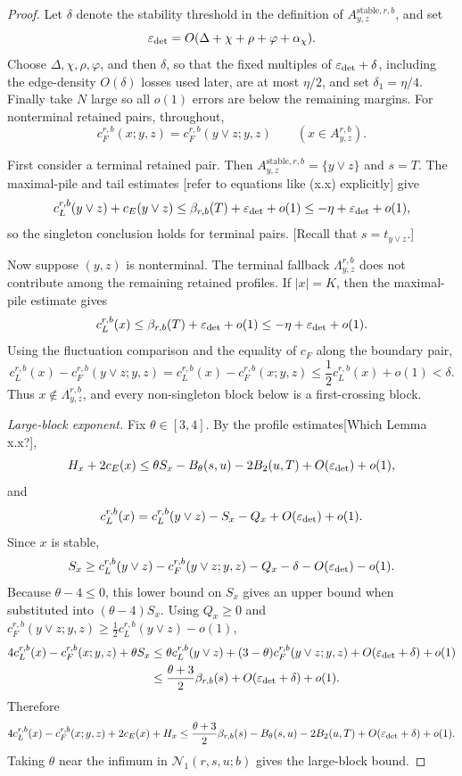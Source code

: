 \documentclass[11pt]{article}
\newcommand{\stable}{\mathrm{stable}}
\newcommand{\jscomment}[1]{\textup{\textsf{\color{blue}[#1]}}}
\begin{document}
\begin{proof}
Let \(\delta\) denote the stability threshold in the definition of
\(A_{y,z}^{\stable,r,b}\), and set
\[
    \varepsilon_{\rm det}=O(\Delta+\chi+\rho+\varphi+\alpha_\chi).
\]
Choose \(\Delta,\chi,\rho,\varphi\), and then \(\delta\), so that the
fixed multiples of \(\varepsilon_{\rm det}+\delta\), including the
edge-density \(O(\delta)\) losses used later, are at most \(\eta/2\), and
set \(\delta_1=\eta/4\). Finally take \(N\) large so all \(o(1)\) errors
are below the remaining margins. For nonterminal retained pairs, throughout,
\[
    c_F^{r,b}(x;y,z)=c_F^{r,b}(y\vee z;y,z)
    \qquad (x\in A_{y,z}^{r,b}).
\]

First consider a terminal retained pair. Then
\(A_{y,z}^{\stable,r,b}=\{y\vee z\}\) and \(s=T\). The maximal-pile and
tail estimates \jscomment{refer to equations like (x.x) explicitly} give
\[
    c_L^{r,b}(y\vee z)+c_E(y\vee z)
    \le \beta_{r,b}(T)+\varepsilon_{\rm det}+o(1)
    \le-\eta+\varepsilon_{\rm det}+o(1),
\]
so the singleton conclusion holds for terminal pairs.
\jscomment{Recall that $s=t_{y \vee z}$.}

Now suppose \((y,z)\) is nonterminal. The terminal fallback
\(\Lambda_{y,z}^{r,b}\) does not contribute among the remaining retained
profiles. If \(|x|=K\), then the
maximal-pile estimate gives
\[
    c_L^{r,b}(x)\le \beta_{r,b}(T)+\varepsilon_{\rm det}+o(1)
    \le-\eta+\varepsilon_{\rm det}+o(1).
\]
Using the fluctuation comparison and the equality of \(c_F\) along the
boundary pair,
\[
    c_L^{r,b}(x)-c_F^{r,b}(y\vee z;y,z)
    =
    c_L^{r,b}(x)-c_F^{r,b}(x;y,z)
    \le \frac12c_L^{r,b}(x)+o(1)<\delta .
\]
Thus \(x\notin\Lambda_{y,z}^{r,b}\), and every non-singleton block below
is a first-crossing block.

\medskip
\noindent\emph{Large-block exponent.}
Fix \(\theta\in[3,4]\). By the profile estimates\jscomment{Which Lemma x.x?},
\[
    H_x+2c_E(x)
    \le \theta S_x-B_\theta(s,u)-2B_2(u,T)
    +O(\varepsilon_{\rm det})+o(1),
\]
and
\[
    c_L^{r,b}(x)
    =
    c_L^{r,b}(y\vee z)-S_x-Q_x+O(\varepsilon_{\rm det})+o(1).
\]
Since \(x\) is stable,
\[
    S_x
    \ge
    c_L^{r,b}(y\vee z)-c_F^{r,b}(y\vee z;y,z)
    -Q_x-\delta-O(\varepsilon_{\rm det})-o(1).
\]
Because \(\theta-4\le0\), this lower bound on \(S_x\) gives an upper
bound when substituted into \((\theta-4)S_x\). Using \(Q_x\ge0\) and
\(c_F^{r,b}(y\vee z;y,z)\ge\frac12c_L^{r,b}(y\vee z)-o(1)\),
\[
\begin{aligned}
    4c_L^{r,b}(x)-c_F^{r,b}(x;y,z)+\theta S_x
    &\le
    \theta c_L^{r,b}(y\vee z)
    +(3-\theta)c_F^{r,b}(y\vee z;y,z)
    +O(\varepsilon_{\rm det}+\delta)+o(1)\\
    &\le
    \frac{\theta+3}{2}\beta_{r,b}(s)
    +O(\varepsilon_{\rm det}+\delta)+o(1).
\end{aligned}
\]
Therefore
\[
    4c_L^{r,b}(x)-c_F^{r,b}(x;y,z)+2c_E(x)+H_x
    \le
    \frac{\theta+3}{2}\beta_{r,b}(s)
    -B_\theta(s,u)-2B_2(u,T)
    +O(\varepsilon_{\rm det}+\delta)+o(1).
\]
Taking \(\theta\) near the infimum in \(\mathcal N_1(r,s,u;b)\) gives
the large-block bound.


\end{proof}
\end{document}
